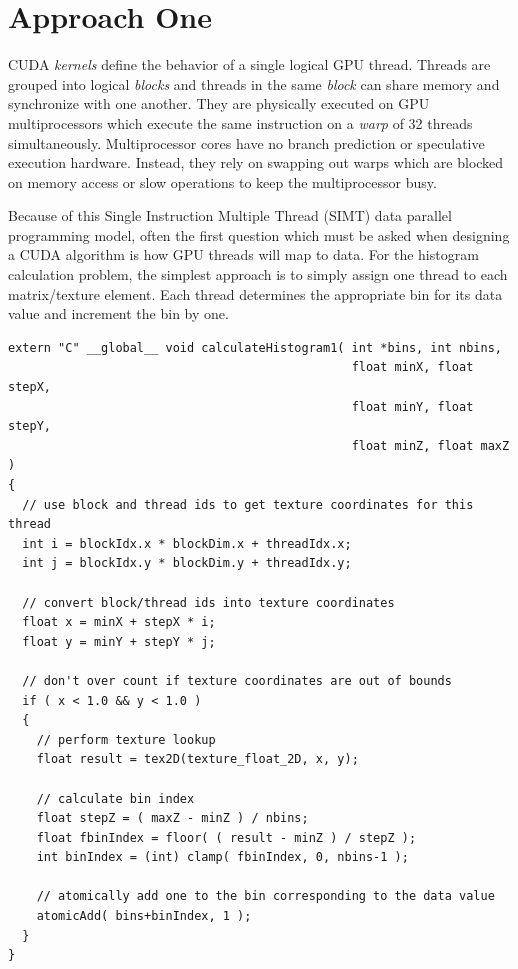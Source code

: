 \documentclass{article}
\begin{document}
\section{Approach One}\label{approach1}

CUDA \emph{kernels} define the behavior of a single logical GPU thread. Threads are grouped into logical \emph{blocks} and threads in the same \emph{block} can share memory and synchronize with one another. They are physically executed on GPU multiprocessors which execute the same instruction on a \emph{warp} of 32 threads simultaneously. Multiprocessor cores have no branch prediction or speculative execution hardware. Instead, they rely on swapping out warps which are blocked on memory access or slow operations to keep the multiprocessor busy. 

Because of this Single Instruction Multiple Thread (SIMT) data parallel programming model, often the first question which must be asked when designing a CUDA algorithm is how GPU threads will map to data. For the histogram calculation problem, the simplest approach is to simply assign one thread to each matrix/texture element. Each thread determines the appropriate bin for its data value and increment the bin by one.

\lstset{language=C,basicstyle=\footnotesize}
\begin{minipage}{\textwidth}
\begin{lstlisting}[caption={calculateHistogram1: Global Memory atomicAdd},label={kernel1}]
extern "C" __global__ void calculateHistogram1( int *bins, int nbins,
                                                float minX, float stepX,
                                                float minY, float stepY,
                                                float minZ, float maxZ )
{
  // use block and thread ids to get texture coordinates for this thread
  int i = blockIdx.x * blockDim.x + threadIdx.x;
  int j = blockIdx.y * blockDim.y + threadIdx.y;

  // convert block/thread ids into texture coordinates
  float x = minX + stepX * i;
  float y = minY + stepY * j;

  // don't over count if texture coordinates are out of bounds
  if ( x < 1.0 && y < 1.0 )
  {
    // perform texture lookup
    float result = tex2D(texture_float_2D, x, y);

    // calculate bin index
    float stepZ = ( maxZ - minZ ) / nbins;
    float fbinIndex = floor( ( result - minZ ) / stepZ );
    int binIndex = (int) clamp( fbinIndex, 0, nbins-1 );

    // atomically add one to the bin corresponding to the data value
    atomicAdd( bins+binIndex, 1 );
  }
}
\end{lstlisting}
\end{minipage}
\end{document}
